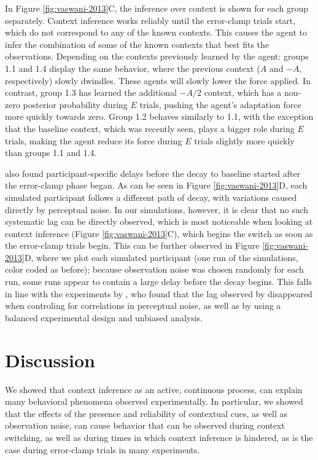 \documentclass[a4paper,doc,floatsintext,natbib]{apa6}
\def \fref #1{Figure \ref{#1}}     %
\begin{document}
In \fref{fig:vaswani-2013}C, the inference over context is shown for each group separately. Context inference works reliably until the error-clamp trials start, which do not correspond to any of the known contexts. This causes the agent to infer the combination of some of the known contexts that best fits the observations. Depending on the contexts previously learned by the agent: groups 1.1 and 1.4 display the same behavior, where the previous context ($A$ and $-A$, respectively) slowly dwindles. These agents will slowly lower the force applied. In contrast, group 1.3 has learned the additional $-A/2$ context, which has a non-zero posterior probability during $E$ trials, pushing the agent's adaptation force more quickly towards zero. Group 1.2 behaves similarly to 1.1, with the exception that the baseline context, which was recently seen, plays a bigger role during $E$ trials, making the agent reduce its force during $E$ trials slightly more quickly than groups 1.1 and 1.4.

\cite{Vaswani_Decay_2013} also found participant-specific delays before the decay to baseline started after the error-clamp phase began. As can be seen in \fref{fig:vaswani-2013}D, each simulated participant follows a different path of decay, with variations caused directly by perceptual noise. In our simulations, however, it is clear that no such systematic lag can be directly observed, which is most noticeable when looking at context inference (\fref{fig:vaswani-2013}C), which begins the switch as soon as the error-clamp trials begin. This can be further observed in \fref{fig:vaswani-2013}D, where we plot each simulated participant (one run of the simulations, color coded as before); because observation noise was chosen randomly for each run, some runs appear to contain a large delay before the decay begins. This falls in line with the experiments by \cite{Brennan_Decay_2015}, who found that the lag observed by \cite{Vaswani_Decay_2013} disappeared when controling for correlations in perceptual noise, as well as by using a balanced experimental design and unbiased analysis.


\section{Discussion}
We showed that context inference as an active, continuous process, can explain many behavioral phenomena observed experimentally. In particular, we showed that the effects of the presence and reliability of contextual cues, as well as observation noise, can cause behavior that can be observed during context switching, as well as during times in which context inference is hindered, as is the case during error-clamp trials in many experiments.
\end{document}
